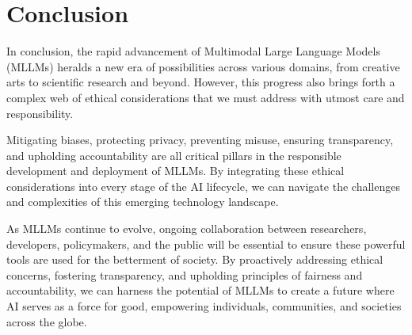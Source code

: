 \section{Conclusion}
In conclusion, the rapid advancement of Multimodal Large Language Models (MLLMs) heralds a new era of possibilities across various domains, from creative arts to scientific research and beyond. However, this progress also brings forth a complex web of ethical considerations that we must address with utmost care and responsibility.

Mitigating biases, protecting privacy, preventing misuse, ensuring transparency, and upholding accountability are all critical pillars in the responsible development and deployment of MLLMs. By integrating these ethical considerations into every stage of the AI lifecycle, we can navigate the challenges and complexities of this emerging technology landscape.

As MLLMs continue to evolve, ongoing collaboration between researchers, developers, policymakers, and the public will be essential to ensure these powerful tools are used for the betterment of society. By proactively addressing ethical concerns, fostering transparency, and upholding principles of fairness and accountability, we can harness the potential of MLLMs to create a future where AI serves as a force for good, empowering individuals, communities, and societies across the globe.

\printbibliography

